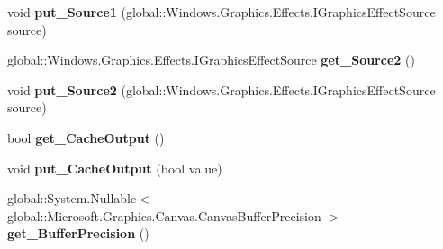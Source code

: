 \begin{DoxyCompactItemize}
\item 
\mbox{\label{class_microsoft_1_1_graphics_1_1_canvas_1_1_effects_1_1_arithmetic_composite_effect_ab58ad1e3f7ba895ee9a6b8ddb6257ed8}} 
void {\bfseries put\+\_\+\+Source1} (global\+::\+Windows.\+Graphics.\+Effects.\+I\+Graphics\+Effect\+Source source)
\item 
\mbox{\label{class_microsoft_1_1_graphics_1_1_canvas_1_1_effects_1_1_arithmetic_composite_effect_a41be28cb5fe0518e3be3a935ee4dc58d}} 
global\+::\+Windows.\+Graphics.\+Effects.\+I\+Graphics\+Effect\+Source {\bfseries get\+\_\+\+Source2} ()
\item 
\mbox{\label{class_microsoft_1_1_graphics_1_1_canvas_1_1_effects_1_1_arithmetic_composite_effect_a6fc942115753422f521d5e898ca31269}} 
void {\bfseries put\+\_\+\+Source2} (global\+::\+Windows.\+Graphics.\+Effects.\+I\+Graphics\+Effect\+Source source)
\item 
\mbox{\label{class_microsoft_1_1_graphics_1_1_canvas_1_1_effects_1_1_arithmetic_composite_effect_a4a8faa27b7f40cff2b8a4d59917a7fa6}} 
bool {\bfseries get\+\_\+\+Cache\+Output} ()
\item 
\mbox{\label{class_microsoft_1_1_graphics_1_1_canvas_1_1_effects_1_1_arithmetic_composite_effect_a41c8211f5c32f5e32af7fab7c98f6225}} 
void {\bfseries put\+\_\+\+Cache\+Output} (bool value)
\item 
\mbox{\label{class_microsoft_1_1_graphics_1_1_canvas_1_1_effects_1_1_arithmetic_composite_effect_a236603da73776f77972d52e595c0626f}} 
global\+::\+System.\+Nullable$<$ global\+::\+Microsoft.\+Graphics.\+Canvas.\+Canvas\+Buffer\+Precision $>$ {\bfseries get\+\_\+\+Buffer\+Precision} ()
\item 
\mbox{\label{class_microsoft_1_1_graphics_1_1_canvas_1_1_effects_1_1_arithmetic_composite_effect_aca2fb121403654ced1e4c0a762df80b6}} 

\end{DoxyCompactItemize}
